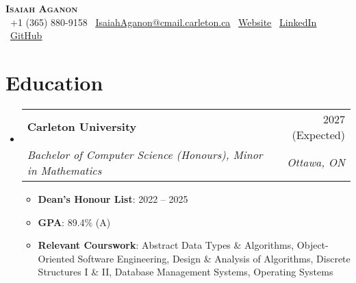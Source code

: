 \documentclass[letterpaper,11pt]{article}
\makeatletter
\newcommand{\resumeItem}[1]{
  \item\small{
    {#1 \vspace{-2pt}}
  }
}
\newcommand{\resumeSubheading}[4]{
  \vspace{-2pt}\item
    \begin{tabular*}{0.97\textwidth}[t]{l@{\extracolsep{\fill}}r}
      \textbf{#1} & #2 \\
      \textit{\small#3} & \textit{\small #4} \\
    \end{tabular*}\vspace{-7pt}
}
\newcommand{\resumeSubHeadingListStart}{\begin{itemize}[leftmargin=0.15in, label={}]}
\newcommand{\resumeSubHeadingListEnd}{\end{itemize}}
\newcommand{\resumeItemListStart}{\begin{itemize}}
\newcommand{\resumeItemListEnd}{\end{itemize}\vspace{-5pt}}
\makeatother
\begin{document}

\begin{center}
  \textbf{\Huge \scshape Isaiah Aganon} \\ \vspace{1pt}
  \small
  \faPhone\ +1 (365) 880-9158  
  \hspace{5pt}
  \faEnvelope\ \href{mailto:IsaiahAganon@cmail.carleton.ca?subject=Re:%20Internship%20Application%20Status&body=Hello%20Isaiah,}{\uline{IsaiahAganon@cmail.carleton.ca}} 
  \hspace{5pt}
  \faGlobe\ \href{https://webpage-aganonisaiahs-projects.vercel.app/}{\uline{Website}}
  \hspace{5pt}
  \faLinkedin\ \href{https://www.linkedin.com/in/isaiah-aganon-888b892a8/}{\uline{LinkedIn}}
  \hspace{5pt}
  \faGithub\ \href{https://github.com/AganonIsaiah}{\uline{GitHub}}
\end{center}


\section{Education}
\resumeSubHeadingListStart
    \resumeSubheading
      {Carleton University}{2027 (Expected)}
      {Bachelor of Computer Science (Honours), Minor in Mathematics}{Ottawa, ON}
      \resumeItemListStart
        \resumeItem{{\bf Dean's Honour List}: 2022 -- 2025} 
        \resumeItem{{\bf GPA}: 89.4\% (A)}
       \resumeItem{{\bf Relevant Courswork}: Abstract Data Types \& Algorithms, Object-Oriented Software Engineering, Design \& Analysis of Algorithms, Discrete Structures I \& II, Database Management Systems, Operating Systems}
      \resumeItemListEnd
\resumeSubHeadingListEnd
\end{document}

